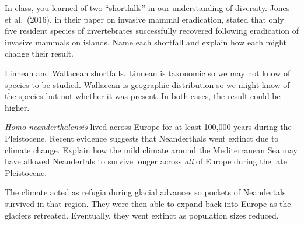 \documentclass[12pt, addpoints]{exam}
\newcommand*\AnswerBox[2]{%
    \parbox[t][#1]{0.92\linewidth}{%
    \begin{solution}#2\end{solution}}
    \vspace*{\stretch{1}}
}
\newlength{\basespace}
\begin{document}
\begin{questions}
\newpage



\question[10]
In class, you learned of two “shortfalls” in our understanding of diversity. Jones et al.~(2016), in their paper on invasive mammal eradication, stated that only five resident species of invertebrates successfully recovered following eradication of invasive mammals on islands.  Name each shortfall and explain how each might change their result.

\AnswerBox{0.2\textheight}{%
	Linnean and Wallacean shortfalls. Linnean is taxonomic so we may not know of species to be studied. Wallacean is geographic distribution so we might  know of the species but not whether it was present. In both cases, the result could be higher.
}



\question[10]
\textit{Homo neanderthalensis} lived across Europe for at least 100,000 years during the Pleistocene. Recent evidence suggests that Neanderthals went extinct due to climate change. Explain how the mild climate around the Mediterranean Sea may have allowed Neandertals to survive longer across \textit{all} of Europe during the late Pleistocene. 

\AnswerBox{0.2\textheight}{%
	The climate acted as refugia during glacial advances so pockets of Neandertals survived in that region. They were then able to expand back into Europe as the glaciers retreated. Eventually, they went extinct as population sizes reduced.
}


%
%
%
%



\end{questions}
\end{document}
